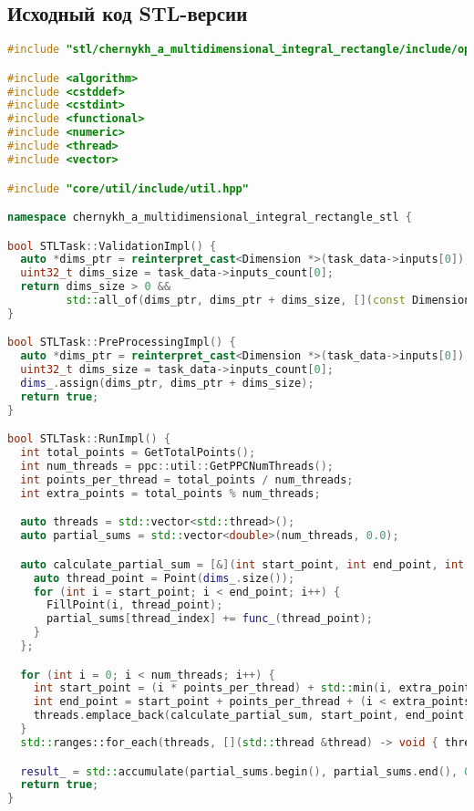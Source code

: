 \documentclass[a4paper,12pt]{article}
\begin{document}
  \subsection{Исходный код STL-версии}\label{subsec:stl}

  \begin{lstlisting}[language=C++,label={lst:stl}]
#include "stl/chernykh_a_multidimensional_integral_rectangle/include/ops_stl.hpp"

#include <algorithm>
#include <cstddef>
#include <cstdint>
#include <functional>
#include <numeric>
#include <thread>
#include <vector>

#include "core/util/include/util.hpp"

namespace chernykh_a_multidimensional_integral_rectangle_stl {

bool STLTask::ValidationImpl() {
  auto *dims_ptr = reinterpret_cast<Dimension *>(task_data->inputs[0]);
  uint32_t dims_size = task_data->inputs_count[0];
  return dims_size > 0 &&
         std::all_of(dims_ptr, dims_ptr + dims_size, [](const Dimension &dim) -> bool { return dim.IsValid(); });
}

bool STLTask::PreProcessingImpl() {
  auto *dims_ptr = reinterpret_cast<Dimension *>(task_data->inputs[0]);
  uint32_t dims_size = task_data->inputs_count[0];
  dims_.assign(dims_ptr, dims_ptr + dims_size);
  return true;
}

bool STLTask::RunImpl() {
  int total_points = GetTotalPoints();
  int num_threads = ppc::util::GetPPCNumThreads();
  int points_per_thread = total_points / num_threads;
  int extra_points = total_points % num_threads;

  auto threads = std::vector<std::thread>();
  auto partial_sums = std::vector<double>(num_threads, 0.0);

  auto calculate_partial_sum = [&](int start_point, int end_point, int thread_index) -> void {
    auto thread_point = Point(dims_.size());
    for (int i = start_point; i < end_point; i++) {
      FillPoint(i, thread_point);
      partial_sums[thread_index] += func_(thread_point);
    }
  };

  for (int i = 0; i < num_threads; i++) {
    int start_point = (i * points_per_thread) + std::min(i, extra_points);
    int end_point = start_point + points_per_thread + (i < extra_points ? 1 : 0);
    threads.emplace_back(calculate_partial_sum, start_point, end_point, i);
  }
  std::ranges::for_each(threads, [](std::thread &thread) -> void { thread.join(); });

  result_ = std::accumulate(partial_sums.begin(), partial_sums.end(), 0.0) * GetScalingFactor();
  return true;
}


\end{lstlisting}
\end{document}
